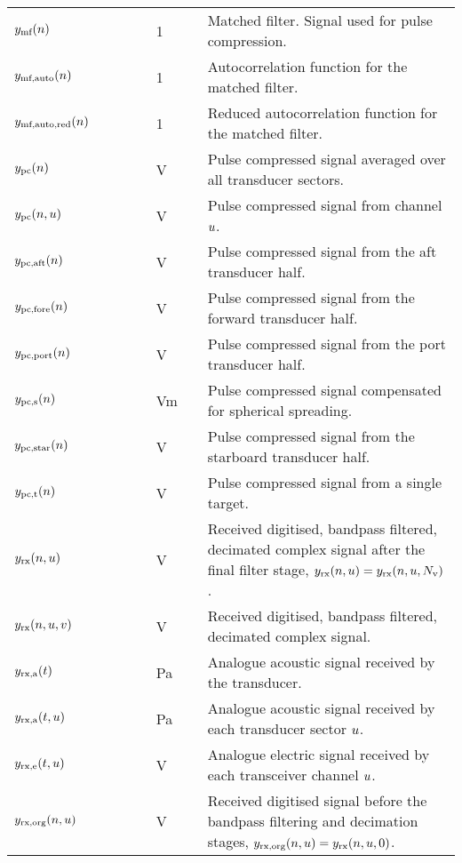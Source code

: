 \documentclass[12pt,a4paper]{article}
\begin{document}
\begin{longtable}{p{0.15\linewidth} p{0.13\linewidth} p{0.12\linewidth} p{0.6\linewidth} }
$y_{\textrm{mf}}(n)$ & & 1 & Matched filter. Signal used for pulse compression.\\
$y_{\textrm{mf,auto}}(n)$ & & 1 & Autocorrelation function for the matched filter.\\
$y_{\textrm{mf,auto,red}}(n)$ & & 1 & Reduced autocorrelation function for the matched filter.\\

$y_{\textrm{pc}}(n)$ & & V & Pulse compressed signal averaged over all transducer sectors.\\
$y_{\textrm{pc}}(n, u) $ & & V & Pulse compressed signal from channel $u$.\\
$y_{\textrm{pc,aft}}(n)$ & & V & Pulse compressed signal from the aft transducer half.\\
$y_{\textrm{pc,fore}}(n)$ & & V & Pulse compressed signal from the forward transducer half.\\
$y_{\textrm{pc,port}}(n)$ & & V & Pulse compressed signal from the port transducer half.\\
$y_{\textrm{pc,s}}(n)$ & & Vm & Pulse compressed signal compensated for spherical spreading.\\
$y_{\textrm{pc,star}}(n)$ & & V & Pulse compressed signal from the starboard transducer half.\\
$y_{\textrm{pc,t}}(n)$ & & V & Pulse compressed signal from a single target.\\

$y_{\textrm{rx}}(n,u)$ & & V & Received digitised, bandpass filtered, decimated complex signal after the final filter stage, $y_{\textrm{rx}}(n,u) = y_{\textrm{rx}}(n,u,N_{\textrm{v}})$.\\
$y_{\textrm{rx}}(n,u,v)$ & & V & Received digitised, bandpass filtered, decimated complex signal.\\
$y_{\textrm{rx,a}}(t)$ & & Pa & Analogue acoustic signal received by the transducer.\\
$y_{\textrm{rx,a}}(t,u)$ & & Pa & Analogue acoustic signal received by each transducer sector $u$.\\
$y_{\textrm{rx,e}}(t,u)$ & & V & Analogue electric signal received by each transceiver channel $u$.\\

$y_{\textrm{rx,org}}(n,u)$ & & V & Received digitised signal before the bandpass filtering and decimation stages, $y_{\textrm{rx,org}}(n,u) = y_{\textrm{rx}}(n,u,0)$.\\


\end{longtable}
\end{document}
